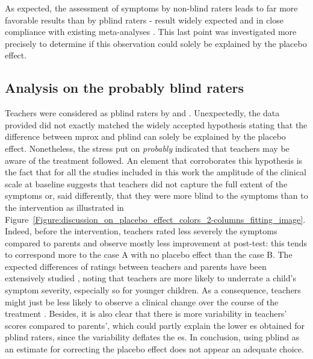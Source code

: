 As expected, the assessment of symptoms by non-blind raters leads to far more favorable results than by \gls{pblind} raters -
result widely expected and in close compliance with existing meta-analyses \citep{Cortese2016, Micoulaud2014}. This last point
was investigated more precisely to determine if this observation could solely be explained by the placebo effect. 

\subsection{Analysis on the probably blind raters}

Teachers were considered as \gls{pblind} raters by \citeauthor{Cortese2016} and \citeauthor{Micoulaud2014}.
Unexpectedly, the data provided did not exactly matched the widely accepted hypothesis stating that the difference between
\gls{mprox} and \gls{pblind} can solely be explained by the placebo effect. 
Nonetheless, the stress put on \emph{probably} indicated that teachers may be aware of the treatment followed. 
An element that corroborates this hypothesis is the fact that for all the studies included in this work the amplitude 
of the clinical scale at baseline suggests that teachers did not capture the full extent of the symptoms or, said differently, 
that they were more blind to the symptoms than to the intervention as illustrated 
in Figure~\ref{Figure:discussion_on_placebo_effect_colors_2-columns_fitting_image}. 
Indeed, before the intervention, teachers rated less severely the symptoms compared to parents and observe mostly less improvement at post-test: 
this tends to correspond more to the case A with no placebo effect than the case B. The expected differences of ratings between 
teachers and parents have been extensively studied \citep{Sollie2013, Narad2015, Minder2018}, noting that teachers are more 
likely to underrate a child's symptom severity, especially so for younger children. As a consequence, teachers might just be less likely 
to observe a clinical change over the course of the treatment \citep{Sollie2013, Narad2015, Minder2018}. Besides, it is also clear 
that there is more variability in teachers' scores compared to parents', which could partly explain the lower \gls{es} obtained for 
\gls{pblind} raters, since the variability deflates the \gls{es}. In conclusion, using \gls{pblind} as an estimate for correcting the 
placebo effect does not appear an adequate choice. 

